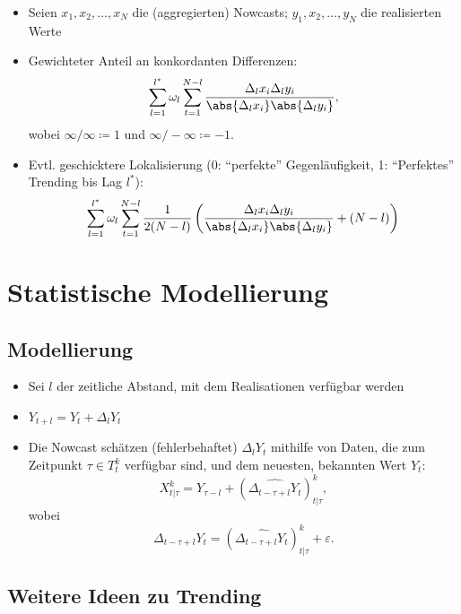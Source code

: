 \documentclass{article}
\theoremstyle{plain}%
\theoremstyle{definition}
\newcommand{\lag}[1][l]{\Delta_{#1}}
\DeclarePairedDelimiter{\abs}\lvert\rvert
\begin{document}
\begin{itemize}
	\item Seien $x_1, x_2, \dots, x_N$ die (aggregierten) Nowcasts; $y_1, x_2, \dots, y_N$ die realisierten Werte
	\item Gewichteter Anteil an konkordanten Differenzen: 
	\begin{equation}
		\sum_{l = 1}^{l^*} \omega_l \sum_{t=1}^{N - l} \frac{\lag x_i \lag y_i}{\abs{\lag x_i} \abs{\lag{y_i}}}, 
	\end{equation}
	wobei $\infty / \infty \coloneqq 1$ und $\infty / - \infty \coloneqq -1$.
	\item Evtl. geschicktere Lokalisierung (0: \enquote{perfekte} Gegenläufigkeit, 1: \enquote{Perfektes} Trending bis Lag $l^*$):
	\begin{equation}
		\sum_{l = 1}^{l^*} \omega_l \sum_{t=1}^{N - l} \frac{1}{2 (N-l)} \left( \frac{\lag x_i \lag y_i}{\abs{\lag x_i} \abs{\lag{y_i}}} + (N-l) \right)
	\end{equation}
\end{itemize}



\section{Statistische Modellierung}
\subsection{Modellierung}
\begin{itemize}
  \item Sei $l$ der zeitliche Abstand, mit dem Realisationen verfügbar werden
  \item $Y_{t + l} = Y_t + \lag Y_t$
  \item Die Nowcast schätzen (fehlerbehaftet) $\lag Y_t$ mithilfe von Daten, die zum Zeitpunkt $\tau \in T_t^k$ verfügbar sind, und dem neuesten, bekannten Wert $Y_t$:
	\begin{equation}
  		X_{t \lvert \tau}^k = Y_{\tau - l} + (\widehat{\lag[t-\tau+l] Y_t})_{t \lvert \tau}^k,
	\end{equation}
	wobei
		\begin{equation}
  			\lag[t-\tau+l] Y_t =  (\widehat{\lag[t-\tau+l] Y_t})_{t \lvert \tau}^k + \varepsilon.
		\end{equation}


\end{itemize}
\subsection{Weitere Ideen zu Trending}
\end{document}

